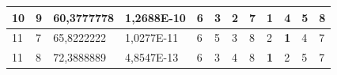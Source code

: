 \documentclass[conference]{IEEEtran}
\begin{document}
\begin{table}[]
\begin{tabular}{|llll|llllllll|}
\multicolumn{1}{|l|}{10}                                                    & \multicolumn{1}{l|}{9}                                                        & \multicolumn{1}{l|}{60,3777778}                                                   & 1,2688E-10                     & \multicolumn{1}{l|}{6}                                                  & \multicolumn{1}{l|}{3}                                                  & \multicolumn{1}{l|}{2}                                                  & \multicolumn{1}{l|}{7}                                                  & \multicolumn{1}{l|}{\textbf{1}}                                         & \multicolumn{1}{l|}{4}                                                  & \multicolumn{1}{l|}{5}                                                  & 8                          \\ \hline
\multicolumn{1}{|l|}{11}                                                    & \multicolumn{1}{l|}{7}                                                        & \multicolumn{1}{l|}{65,8222222}                                                   & 1,0277E-11                     & \multicolumn{1}{l|}{6}                                                  & \multicolumn{1}{l|}{5}                                                  & \multicolumn{1}{l|}{3}                                                  & \multicolumn{1}{l|}{8}                                                  & \multicolumn{1}{l|}{2}                                                  & \multicolumn{1}{l|}{\textbf{1}}                                         & \multicolumn{1}{l|}{4}                                                  & 7                          \\ \hline
\multicolumn{1}{|l|}{11}                                                    & \multicolumn{1}{l|}{8}                                                        & \multicolumn{1}{l|}{72,3888889}                                                   & 4,8547E-13                     & \multicolumn{1}{l|}{6}                                                  & \multicolumn{1}{l|}{3}                                                  & \multicolumn{1}{l|}{4}                                                  & \multicolumn{1}{l|}{8}                                                  & \multicolumn{1}{l|}{\textbf{1}}                                         & \multicolumn{1}{l|}{2}                                                  & \multicolumn{1}{l|}{5}                                                  & 7                          \\ \hline

\end{tabular}
\end{table}
\end{document}
